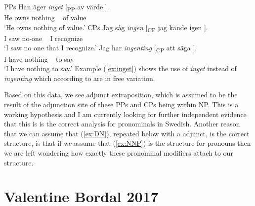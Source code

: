 \documentclass[12pt, letterpaper]{article}
\begin{document}
	\ea PPs
		\ea \label{ex:inget}
		\gll Han äger \textit{inget} [\textsubscript{PP} av värde ].\\
			He owns nothing ~ of value\\
		\glt `He owns nothing of value.'
		\z 
	\ex CPs
		\ea
		\gll Jag såg \textit{ingen} [\textsubscript{CP} jag {kände igen} ].\\
		I saw no-one ~ I recognize\\
		\glt `I saw no one that I recognize.'
		\ex 
		\gll Jag har \textit{ingenting} [\textsubscript{CP} att säga ].\\
		I have nothing ~ to say\\
		\glt `I have nothing to say.'
		\z 
	\z
\ex Example (\ref{ex:inget}) shows the use of \textit{inget} instead of \textit{ingenting} which according to \citet{holmesSwedishComprehensiveGrammar2013} are in free variation.

\ex Based on this data, we see adjunct extraposition, which is assumed to be the result of the adjunction site of these PPs and CPs being within NP.
	\ea This is a working hypothesis and I am currently looking for further independent evidence that this is is the correct analysis for pronominals in Swedish.
	\z 
\ex Another reason that we can assume that (\ref{ex:DN}), repeated below with a adjunct, is the correct structure, is that if we assume that (\ref{ex:NNP}) is the structure for pronouns then we are left wondering how exactly these pronominal modifiers attach to our structure.
	\ea {}
	\z 
\z  

\section{Valentine Bordal 2017} \label{sec:VB}
\end{document}
